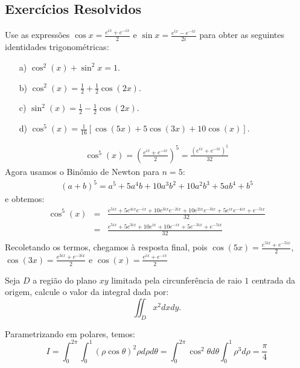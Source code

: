 \subsection*{Exercícios Resolvidos}
\begin{exeresol}Use as expressões $\cos x=\frac{e^{ix}+e^{-ix}}{2}$ e $\sin x=\frac{e^{ix}-e^{-ix}}{2i}$ para obter as seguintes identidades trigonométricas:
\begin{itemize}
\item[a)] $\cos^2(x)+\sin^2x=1$.
\item[b)] $\cos^2(x)=\frac{1}{2}+\frac{1}{2}\cos(2x)$.
\item[c)] $\sin^2(x)=\frac{1}{2}-\frac{1}{2}\cos(2x)$.
\item[d)] $\cos^5(x)=\frac{1}{16}\left[\cos(5x)+5\cos(3x)+10\cos(x)\right]$.
\end{itemize}
\end{exeresol}
\begin{resol}
\begin{eqnarray*}
\cos^5(x)=\left(\frac{e^{ix}+e^{-ix}}{2}\right)^5=\frac{\left({e^{ix}+e^{-ix}}\right)^5}{32}
\end{eqnarray*}
Agora usamos o Binômio de Newton para $n=5$:
\begin{eqnarray*}
(a+b)^5=a^5+5a^4b+10a^3b^2+10a^2b^3+5ab^4+b^5
\end{eqnarray*}
e obtemos:
\begin{eqnarray*}
\cos^5(x)&=&\frac{{e^{5ix}+5e^{4ix}e^{-ix}+10e^{3ix}e^{-2ix}+10e^{2ix}e^{-3ix}+5e^{ix}e^{-4ix}+e^{-5ix}}}{32}\\
&=&\frac{{e^{5ix}+5e^{3ix}+10e^{ix}+10e^{-ix}+5e^{-3ix}+e^{-5ix}}}{32}\\
\end{eqnarray*}
Recoletando os termos, chegamos à resposta final, pois $\cos(5x)=\frac{e^{5ix}+e^{-5ix}}{2}$, $\cos(3x)=\frac{e^{3ix}+e^{-3ix}}{2}$ e $\cos(x)=\frac{e^{ix}+e^{-ix}}{2}$
\end{resol}

\begin{exeresol}Seja $D$ a região do plano $xy$ limitada pela circunferência de raio $1$ centrada da origem, calcule o valor da integral dada por:
$$\iint_D x^2 dxdy.$$
\end{exeresol}
\begin{resol}Parametrizando em polares, temos:
$$I= \int_0^{2\pi}\int_0^1 (\rho\cos\theta)^2\rho d\rho d\theta=\int_{0}^{2\pi}\cos^2\theta d\theta\int_0^1\rho^3d\rho=\frac{\pi}{4}$$
\end{resol}


